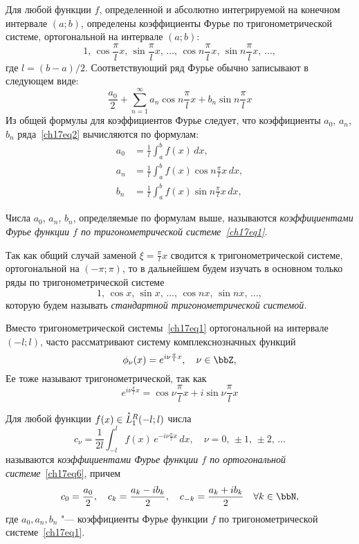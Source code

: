 Для любой функции $f$, определенной и абсолютно интегрируемой на конечном интервале $(a;b)$, определены коэффициенты Фурье по тригонометрической системе, ортогональной на интервале $(a;b)$:
\begin{equation} \label{ch17eq1}
1,\, \cos \frac{\pi}{l}x,\, \sin \frac{\pi}{l}x,\,\ldots,\,\cos n\frac{\pi}{l}x,\, \sin n\frac{\pi}{l}x,\,\ldots,
\end{equation}
где $l = (b - a)/2$. Соответствующий ряд Фурье обычно записывают в следующем виде:
\begin{equation} \label{ch17eq2}
\frac{a_0}{2} + \sum_{n = 1}^{\infty} a_{n} \cos n\frac{\pi}{l}x + b_{n} \sin n\frac{\pi}{l}x
\end{equation}
Из общей формулы для коэффициентов Фурье следует, что коэффициенты $a_0$, $a_n$, $b_n$ ряда~\eqref{ch17eq2} вычисляются по формулам:
\begin{align} \label{ch17eq3}
a_0 &= \frac{1}{l} \int_{a}^{b} f(x)\,dx,\\
a_n &= \frac{1}{l} \int_{a}^{b} f(x)\cos n\frac{\pi}{l}x\, dx,\\
b_n &= \frac{1}{l} \int_{a}^{b} f(x)\sin n\frac{\pi}{l}x\, dx,
\end{align}

\begin{defn}
Числа $a_0$, $a_n$, $b_n$, определяемые по формулам выше, называются \textit{коэффициентами Фурье функции $f$ по тригонометрической системе~\eqref{ch17eq1}}.
\end{defn}

Так как общий случай заменой $\xi = \frac{\pi}{l} x$ сводится к тригонометрической системе, ортогональной на $(-\pi;\pi)$, то в дальнейшем будем изучать в основном только ряды по тригонометрической системе
$$
1,\, \cos x,\, \sin x,\,\ldots,\,\cos nx,\, \sin nx,\,\ldots,
$$
которую будем называть \textit{стандартной тригонометрической системой.}

Вместо тригонометрической системы~\eqref{ch17eq1} ортогональной на интервале~$(-l;l)$, часто рассматривают систему комплекснозначных функций
\begin{equation} \label{ch17eq6}
\phi_{\nu}(x) = e^{i\nu\frac{\pi}{l}x},\quad \nu \in \bbZ,
\end{equation}
Ее тоже называют тригонометрической, так как
$$
e^{i\nu\frac{\pi}{l}x} = \cos \nu\frac{\pi}{l}x + i \sin \nu\frac{\pi}{l}x
$$
\begin{defn}
Для любой функции $f(x) \in \accentset{*}{L}^{R}_1(-l;l)$ числа
\begin{equation}
c_{\nu} = \frac{1}{2l} \int_{-l}^{l} f(x)\, e^{-i\nu\frac{\pi}{l}x}\,dx,\quad \nu = 0,\, \pm 1,\, \pm 2,\,\ldots
\end{equation}
называются \textit{коэффициентами Фурье функции $f$ по ортогональной системе}~\eqref{ch17eq6}, причем
\begin{equation}
c_0 = \frac{a_0}{2}, \quad c_{k} = \frac{a_k - ib_k}{2}, \quad c_{-k} = \frac{a_k + ib_k}{2} \quad \forall k \in \bbN,
\end{equation}
где $a_0, a_n, b_n$ "--- коэффициенты Фурье функции $f$ по тригонометрической системе~\eqref{ch17eq1}.
\end{defn}

